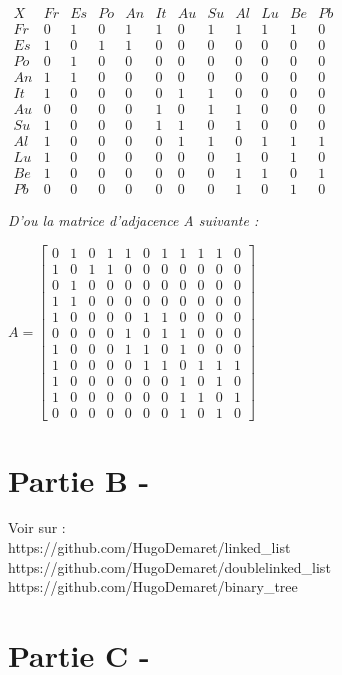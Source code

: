 \documentclass{article}
\begin{document}
	\begin{center}
	$
	\begin{matrix}
		X & Fr & Es & Po & An & It & Au & Su & Al & Lu & Be & Pb\\
		Fr&0&1&0&1&1&0&1&1&1&1&0\\
		Es&1&0&1&1&0&0&0&0&0&0&0\\
		Po&0&1&0&0&0&0&0&0&0&0&0\\
		An&1&1&0&0&0&0&0&0&0&0&0\\
		It&1&0&0&0&0&1&1&0&0&0&0\\
		Au&0&0&0&0&1&0&1&1&0&0&0\\
		Su&1&0&0&0&1&1&0&1&0&0&0\\
		Al&1&0&0&0&0&1&1&0&1&1&1\\
		Lu&1&0&0&0&0&0&0&1&0&1&0\\
		Be&1&0&0&0&0&0&0&1&1&0&1\\
		Pb&0&0&0&0&0&0&0&1&0&1&0
	\end{matrix}
	$
\end{center}
	\textit{D'ou la matrice d'adjacence A suivante :}
\begin{center}
	$
	A = 
	\left[\begin{matrix}
		0&1&0&1&1&0&1&1&1&1&0\\
		1&0&1&1&0&0&0&0&0&0&0\\
		0&1&0&0&0&0&0&0&0&0&0\\
		1&1&0&0&0&0&0&0&0&0&0\\
		1&0&0&0&0&1&1&0&0&0&0\\
		0&0&0&0&1&0&1&1&0&0&0\\
		1&0&0&0&1&1&0&1&0&0&0\\
		1&0&0&0&0&1&1&0&1&1&1\\
		1&0&0&0&0&0&0&1&0&1&0\\
		1&0&0&0&0&0&0&1&1&0&1\\
		0&0&0&0&0&0&0&1&0&1&0
	\end{matrix}\right]
	$
	\end{center}
\section*{Partie B -}
Voir sur :\\
	https://github.com/HugoDemaret/linked\_list\\
	https://github.com/HugoDemaret/doublelinked\_list\\
	https://github.com/HugoDemaret/binary\_tree\\

\section*{Partie C -}
\end{document}
